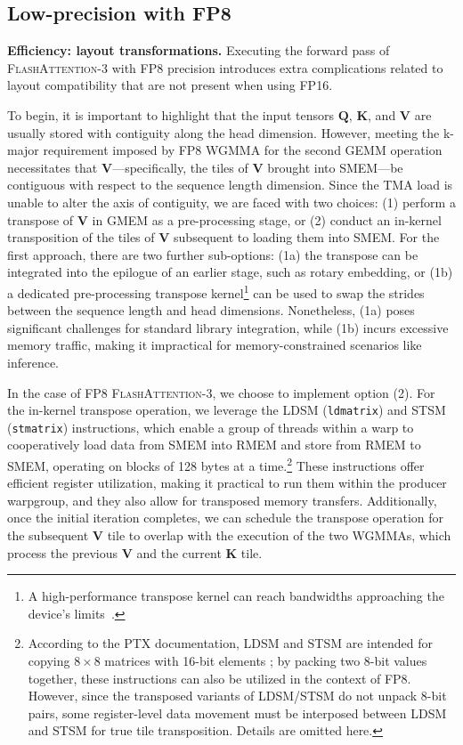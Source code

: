 \subsection{Low-precision with FP8}
\label{sec:algofp8}

\textbf{Efficiency: layout transformations.} Executing the forward pass of \textsc{FlashAttention-3} with FP8 precision introduces extra complications related to layout compatibility that are not present when using FP16.

To begin, it is important to highlight that the input tensors $\mathbf{Q}$, $\mathbf{K}$, and $\mathbf{V}$ are usually stored with contiguity along the head dimension. However, meeting the k-major requirement imposed by FP8 WGMMA for the second GEMM operation necessitates that $\mathbf{V}$—specifically, the tiles of $\mathbf{V}$ brought into SMEM—be contiguous with respect to the sequence length dimension. Since the TMA load is unable to alter the axis of contiguity, we are faced with two choices: (1) perform a transpose of $\mathbf{V}$ in GMEM as a pre-processing stage, or (2) conduct an in-kernel transposition of the tiles of $\mathbf{V}$ subsequent to loading them into SMEM. For the first approach, there are two further sub-options: (1a) the transpose can be integrated into the epilogue of an earlier stage, such as rotary embedding, or (1b) a dedicated pre-processing transpose kernel\footnote{A high-performance transpose kernel can reach bandwidths approaching the device’s limits~\citep{colfax_cutlass_transpose_2024}.} can be used to swap the strides between the sequence length and head dimensions. Nonetheless, (1a) poses significant challenges for standard library integration, while (1b) incurs excessive memory traffic, making it impractical for memory-constrained scenarios like inference.

In the case of FP8 \textsc{FlashAttention-3}, we choose to implement option (2). For the in-kernel transpose operation, we leverage the LDSM (\verb|ldmatrix|) and STSM (\verb|stmatrix|) instructions, which enable a group of threads within a warp to cooperatively load data from SMEM into RMEM and store from RMEM to SMEM, operating on blocks of 128 bytes at a time.\footnote{According to the PTX documentation, LDSM and STSM are intended for copying $8 \times 8$ matrices with 16-bit elements \cite[\S 9.7.13.4.15-16]{ptx}; by packing two 8-bit values together, these instructions can also be utilized in the context of FP8. However, since the transposed variants of LDSM/STSM do not unpack 8-bit pairs, some register-level data movement must be interposed between LDSM and STSM for true tile transposition. Details are omitted here.} These instructions offer efficient register utilization, making it practical to run them within the producer warpgroup, and they also allow for transposed memory transfers. Additionally, once the initial iteration completes, we can schedule the transpose operation for the subsequent $\mathbf{V}$ tile to overlap with the execution of the two WGMMAs, which process the previous $\mathbf{V}$ and the current $\mathbf{K}$ tile.

